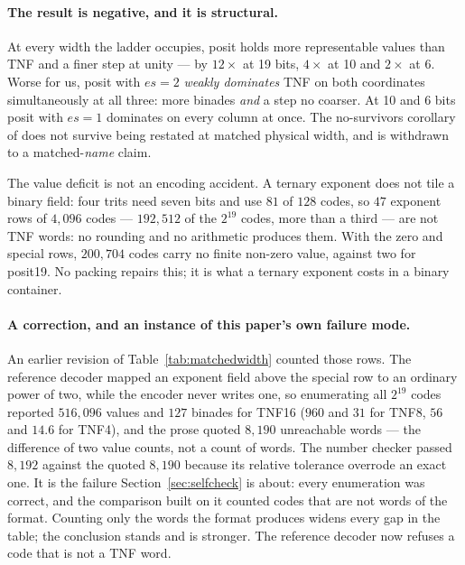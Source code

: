 \paragraph{The result is negative, and it is structural.} At every width the
ladder occupies, posit holds more representable values than TNF and a finer step
at unity --- by $12\times$ at 19 bits, $4\times$ at 10 and $2\times$ at 6. Worse
for us, posit with $es{=}2$ \emph{weakly dominates} TNF on both coordinates
simultaneously at all three: more binades \emph{and} a step no coarser. At 10 and
6 bits posit with $es{=}1$ dominates on every column at once. The
no-survivors corollary of  does not survive being
restated at matched physical width, and is withdrawn to a matched-\emph{name}
claim.

The value deficit is not an encoding accident. A ternary exponent does not tile
a binary field: four trits need seven bits and use $81$ of $128$ codes, so $47$
exponent rows of $4{,}096$ codes --- $192{,}512$ of the $2^{19}$ codes, more than a
third --- are not TNF words: no rounding and no arithmetic produces them. With the
zero and special rows, $200{,}704$ codes carry no finite non-zero value, against
two for posit19. No packing repairs this; it is what a ternary exponent costs in
a binary container.

\paragraph{A correction, and an instance of this paper's own failure mode.}
An earlier revision of Table~\ref{tab:matchedwidth} counted those rows. The
reference decoder mapped an exponent field above the special row to an ordinary
power of two, while the encoder never writes one, so enumerating all $2^{19}$
codes reported $516{,}096$ values and $127$ binades for TNF16 ($960$ and $31$
for TNF8, $56$ and $14.6$ for TNF4), and the prose quoted $8{,}190$ unreachable
words --- the difference of two value counts, not a count of words. The number
checker passed $8{,}192$ against the quoted $8{,}190$ because its relative
tolerance overrode an exact one. It is the failure Section~\ref{sec:selfcheck}
is about: every enumeration was correct, and the comparison built on it counted
codes that are not words of the format. Counting only the words the format
produces widens every gap in the table; the conclusion stands and is stronger.
The reference decoder now refuses a code that is not a TNF word.


